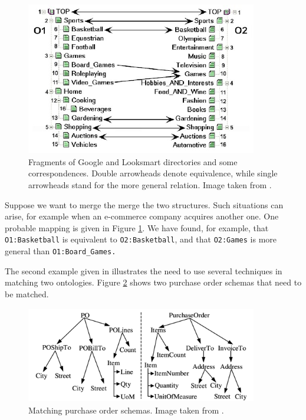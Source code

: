 \begin{figure}[h]
    \centering
        \includegraphics[width=101mm, height=67mm]{images/F2GoogleLooksmart.png}%
        \caption{Fragments of Google and Looksmart directories and some
correspondences. Double arrowheads denote equivalence, while single
arrowheads stand for the more general relation. Image taken from
\cite{giunchiglia2008evaluation}.}
    \label{fig:GoogleLooksmart}
\end{figure}

Suppose we want to merge the merge the two structures. Such situations
can arise, for example when an e-commerce company acquires another one.
One probable mapping is given in Figure \ref{fig:GoogleLooksmart}. We have found, for example,
that \texttt{O1:Basketball} is equivalent to
\texttt{O2:Basketball}, and that
\texttt{O2:Games} is more general than
\texttt{O1:Board\_Games.} 

The second example given in \cite{madhavan2001schema_matching} illustrates the
need to use several techniques in matching two ontologies. Figure \ref{fig:POSchemas}
shows two purchase order schemas that need to be matched. 

\begin{figure}[h]
    \centering
        \includegraphics [width=101mm, height=42mm]{images/F1POSchemas.png}%
        \caption{Matching purchase order schemas. Image taken from \cite{madhavan2001schema_matching}.}
    \label{fig:POSchemas}
\end{figure}

